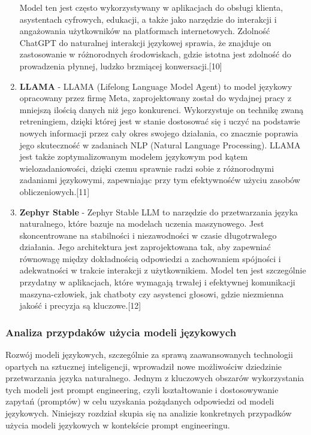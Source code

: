 \begin{enumerate}
Model ten jest często wykorzystywany w aplikacjach do obsługi klienta, asystentach cyfrowych, edukacji, a także jako narzędzie do interakcji i angażowania użytkowników na platformach internetowych. Zdolność ChatGPT do naturalnej interakcji językowej sprawia, że znajduje on zastosowanie w różnorodnych środowiskach, gdzie istotna jest zdolność do prowadzenia płynnej, ludzko brzmiącej konwersacji.[10]
\\
\item {\bf LLAMA} - LLAMA (Lifelong Language Model Agent) to model językowy opracowany przez firmę Meta, zaprojektowany został do wydajnej pracy z mniejszą ilością danych niż jego konkurenci. Wykorzystuje on technikę zwaną retreningiem, dzięki której jest w stanie dostosować się i uczyć na podstawie nowych informacji przez cały okres swojego działania, co znacznie poprawia jego skuteczność w zadaniach NLP (Natural Language Processing). LLAMA jest także zoptymalizowanym modelem językowym pod kątem wielozadaniowości, dzięki czemu sprawnie radzi sobie z różnorodnymi zadaniami językowymi, zapewniając przy tym efektywność\linebreak w użyciu zasobów obliczeniowych.[11]
\\
\item {\bf Zephyr Stable} - Zephyr Stable LLM to narzędzie do przetwarzania języka naturalnego, które bazuje na modelach uczenia maszynowego. Jest skoncentrowane na stabilności i niezawodności w czasie długotrwałego działania. Jego architektura jest zaprojektowana tak, aby zapewniać równowagę między dokładnością odpowiedzi a zachowaniem spójności i adekwatności w trakcie interakcji z użytkownikiem. Model ten jest szczególnie przydatny w aplikacjach, które wymagają trwałej i efektywnej komunikacji maszyna-człowiek, jak chatboty czy asystenci głosowi, gdzie niezmienna jakość i precyzja są kluczowe.[12]
\\

\end{enumerate}

\subsubsection{Analiza przypdaków użycia modeli językowych}

Rozwój modeli językowych, szczególnie za sprawą zaawansowanych technologii opartych na sztucznej inteligencji, wprowadził nowe możliwości\linebreak w dziedzinie przetwarzania języka naturalnego. Jednym z kluczowych obszarów wykorzystania tych modeli jest prompt engineering, czyli kształtowanie i dostosowywanie zapytań (promptów) w celu uzyskania pożądanych odpowiedzi od modeli językowych. Niniejszy rozdział skupia się na analizie konkretnych przypadków użycia modeli językowych w kontekście prompt engineeringu.

